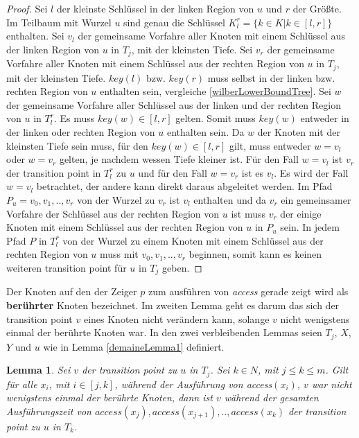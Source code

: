 \documentclass[a4paper,12pt]{article}
\begin{document}
\begin{proof}
Sei $l$ der kleinste Schlüssel in der linken Region von $u$ und $r$ der Größte. Im Teilbaum mit Wurzel $u$ sind genau die Schlüssel $K^r_l = \{k \in K \vert k \in \left[l,r\right]\}$ enthalten. Sei $v_l$ der gemeinsame Vorfahre aller Knoten mit einem Schlüssel aus der linken Region von $u$ in $T_j$, mit der kleinsten Tiefe. Sei $v_r$ der gemeinsame Vorfahre aller Knoten mit einem Schlüssel aus der rechten Region von $u$ in $T_j$, mit der kleinsten Tiefe. $\mathit{key\left(l\right)}$ bzw. $\mathit{key\left(r\right)}$ muss selbst in der linken bzw. rechten Region von $u$ enthalten sein, vergleiche \ref{wilberLowerBoundTree}. Sei $w$ der gemeinsame Vorfahre aller Schlüssel aus der linken und der rechten Region von $u$ in $T^r_l$. Es muss $\mathit{key}\left(w\right) \in \left[l,r\right]$ gelten. Somit muss  $\mathit{key}\left(w\right)$ entweder in der linken oder rechten Region von $u$ enthalten sein. Da $w$ der Knoten mit der kleinsten Tiefe sein muss, für den  $\mathit{key\left(w\right)} \in \left[l,r\right]$  gilt, muss entweder $w = v_l$ oder $w = v_r$ gelten, je nachdem wessen Tiefe kleiner ist. Für den Fall $w = v_l$ ist $v_r$ der transition point in $T^r_l$ zu $u$ und für den Fall $w = v_r$ ist es $v_l$.
Es wird der Fall $w = v_l$ betrachtet, der andere kann direkt daraus abgeleitet werden. Im Pfad $P_u = v_0,v_1,..,v_r$ von der Wurzel zu $v_r$ ist $v_l$ enthalten und da $v_r$ ein gemeinsamer Vorfahre der Schlüssel aus der rechten Region von $u$ ist muss $v_r$ der einige Knoten mit einem Schlüssel aus der rechten Region von $u$ in $P_u$ sein. In jedem Pfad $P$ in $T_l^r$ von der Wurzel zu einem Knoten mit einem Schlüssel aus der rechten Region von $u$ muss mit $v_0,v_1,..,v_r$ beginnen, somit kann es keinen weiteren transition point für $u$ in $T_j$ geben. 
	
\end{proof}
\noindent Der Knoten auf den der Zeiger $p$ zum ausführen von \textit{access} gerade zeigt wird als \textbf{berührter} Knoten bezeichnet.
 Im zweiten Lemma geht es darum das sich der transition point $v$ eines Knoten nicht verändern kann, solange $v$ nicht wenigstens einmal der berührte Knoten war. In den zwei verbleibenden Lemmas seien  $T_j$, $X$, $Y$ und $u$ wie in  Lemma \ref{demaineLemma1} definiert. 



\newtheorem{Lemma2}{Lemma}[section] \label{lemmaDemaine2}
\begin{Lemma2} \label{demaineLemma2}
Sei $v$ der transition point zu $u$ in $T_j$.  Sei  $k \in \mathit{N}$, mit $j \leq k \leq m$. Gilt für alle $x_i$, mit $i \in \left[j,k\right]$, während der Ausführung von \textit{access}$\left(x_i\right)$,  $v$ war nicht wenigstens einmal der berührte Knoten, dann ist $v$ während der gesamten Ausführungszeit von $\textit{access}\left(x_j\right),\textit{access}\left(x_{j+1}\right),..,\textit{access}\left(x_k\right)$ der transition point zu $u$ in $T_k$. 
\end{Lemma2}
\end{document}
